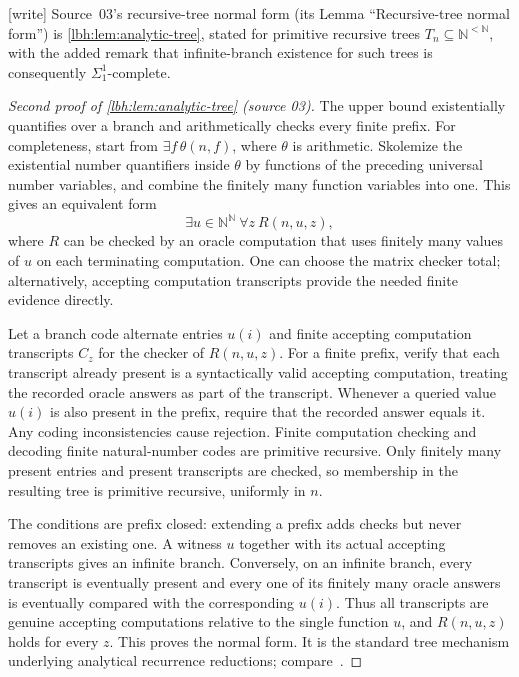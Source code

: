 \documentclass[11pt,letterpaper]{article}
\theoremstyle{definition}
\theoremstyle{remark}
\newcommand{\N}{\mathbb N}
\newcommand{\1}{\mathbf 1}
\newcommand{\wtag}{\textup{[write]}}%
\begin{document}
\wtag{} Source~03's recursive-tree normal form (its Lemma ``Recursive-tree normal form'') is
\cref{lbh:lem:analytic-tree}, stated for primitive recursive trees $T_n\subseteq\N^{<\N}$, with
the added remark that infinite-branch existence for such trees is consequently
$\Sigma^1_1$-complete.
\begin{proof}[Second proof of \cref{lbh:lem:analytic-tree} (source 03)]
The upper bound existentially quantifies over a branch and arithmetically
checks every finite prefix. For completeness, start from
$\exists f\,\theta(n,f)$, where $\theta$ is arithmetic. Skolemize the
existential number quantifiers inside $\theta$ by functions of the preceding
universal number variables, and combine the finitely many function variables
into one. This gives an equivalent form
\[
 \exists u\in\N^\N\ \forall z\ R(n,u,z),
\]
where $R$ can be checked by an oracle computation that uses finitely many
values of $u$ on each terminating computation. One can choose the matrix
checker total; alternatively, accepting computation transcripts provide
the needed finite evidence directly.

Let a branch code alternate entries $u(i)$ and finite accepting computation
transcripts $C_z$ for the checker of $R(n,u,z)$. For a finite prefix, verify
that each transcript already present is a syntactically valid accepting
computation, treating the recorded oracle answers as part of the transcript.
Whenever a queried value $u(i)$ is also present in the prefix, require that
the recorded answer equals it. Any coding inconsistencies cause rejection.
Finite computation checking and decoding finite natural-number codes are
primitive recursive. Only finitely many present entries and present
transcripts are checked, so membership in the resulting tree is primitive
recursive, uniformly in $n$.

The conditions are prefix closed: extending a prefix adds checks but never
removes an existing one. A witness $u$ together with its actual accepting
transcripts gives an infinite branch. Conversely, on an infinite branch,
every transcript is eventually present and every one of its finitely many
oracle answers is eventually compared with the corresponding $u(i)$. Thus
all transcripts are genuine accepting computations relative to the single
function $u$, and $R(n,u,z)$ holds for every $z$. This proves the normal form.
It is the standard tree mechanism underlying analytical recurrence
reductions; compare~\cite{harel1986}.
\end{proof}
\end{document}

